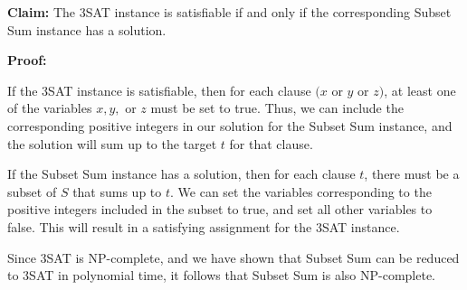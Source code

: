 \textbf{Claim:} The 3SAT instance is satisfiable if and only if the corresponding Subset Sum instance has a solution.

\textbf{Proof:}

If the 3SAT instance is satisfiable, then for each clause $(x$ or $y$ or $z)$, at least one of the variables $x, y,$ or $z$ must be set to true. Thus, we can include the corresponding positive integers in our solution for the Subset Sum instance, and the solution will sum up to the target $t$ for that clause.

If the Subset Sum instance has a solution, then for each clause $t$, there must be a subset of $S$ that sums up to $t$. We can set the variables corresponding to the positive integers included in the subset to true, and set all other variables to false. This will result in a satisfying assignment for the 3SAT instance.

Since 3SAT is NP-complete, and we have shown that Subset Sum can be reduced to 3SAT in polynomial time, it follows that Subset Sum is also NP-complete.
%